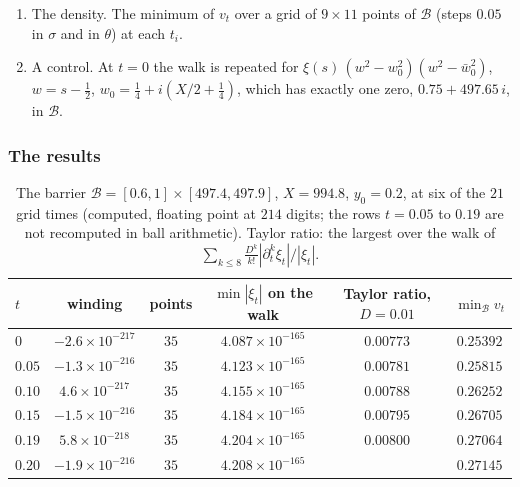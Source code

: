 \begin{enumerate}
\[\]
for $s=\frac12+x+i\theta$, by $|(u+i\eta)^{2k}|=|u+i\eta|^{2k}$ and $\sum_{k>8}r^k/k!\le r^9e^r/9!$; the integral is computed by Gauss Legendre quadrature at $x=\frac12$, $\theta=497.4$ and $\eta=0.38$, which bounds it on $\mathcal B$ because the integrand increases with $x$ and $e^{-2\eta\theta}$ decreases with $\theta$.
\item The density. The minimum of $v_t$ over a grid of $9\times11$ points of $\mathcal B$ (steps $0.05$ in $\sigma$ and in $\theta$) at each $t_i$.
\item A control. At $t=0$ the walk is repeated for $\xi(s)\,(w^2-w_0^2)(w^2-\bar w_0^2)$, $w=s-\frac12$, $w_0=\frac14+i(X/2+\frac14)$, which has exactly one zero, $0.75+497.65\,i$, in $\mathcal B$.
\end{enumerate}

\subsubsection{The results}

\begin{table}[ht]
\centering\small
\begin{tabular}{@{}lccccc@{}}
\toprule
$t$ & winding & points & $\min|\xi_t|$ on the walk & Taylor ratio, $D=0.01$ & $\min_{\mathcal B}v_t$\\
\midrule
$0$ & $-2.6\times10^{-217}$ & $35$ & $4.087\times10^{-165}$ & $0.00773$ & $0.25392$\\
$0.05$ & $-1.3\times10^{-216}$ & $35$ & $4.123\times10^{-165}$ & $0.00781$ & $0.25815$\\
$0.10$ & $4.6\times10^{-217}$ & $35$ & $4.155\times10^{-165}$ & $0.00788$ & $0.26252$\\
$0.15$ & $-1.5\times10^{-216}$ & $35$ & $4.184\times10^{-165}$ & $0.00795$ & $0.26705$\\
$0.19$ & $5.8\times10^{-218}$ & $35$ & $4.204\times10^{-165}$ & $0.00800$ & $0.27064$\\
$0.20$ & $-1.9\times10^{-216}$ & $35$ & $4.208\times10^{-165}$ & & $0.27145$\\
\bottomrule
\end{tabular}
\caption{The barrier $\mathcal B=[0.6,1]\times[497.4,497.9]$, $X=994.8$, $y_0=0.2$, at six of the $21$ grid times (computed, floating point at $214$ digits; the rows $t=0.05$ to $0.19$ are not recomputed in ball arithmetic). Taylor ratio: the largest over the walk of $\sum_{k\le8}\frac{D^k}{k!}|\partial_t^k\xi_t|/|\xi_t|$.}
\label{barrier:tab:check}
\end{table}

